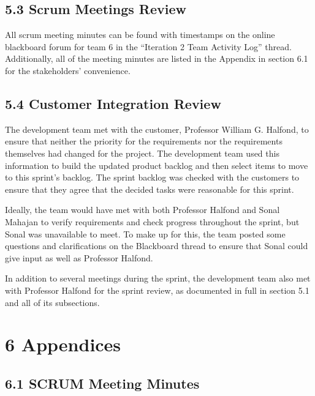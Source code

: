 \documentclass[]{article}
\begin{document}
\subsection{5.3 Scrum Meetings Review}\label{scrum-meetings-review}

All scrum meeting minutes can be found with timestamps on the online
blackboard forum for team 6 in the ``Iteration 2 Team Activity Log''
thread. Additionally, all of the meeting minutes are listed in the
Appendix in section 6.1 for the stakeholders' convenience.

\subsection{5.4 Customer Integration
Review}\label{customer-integration-review}

The development team met with the customer, Professor William G.
Halfond, to ensure that neither the priority for the requirements nor
the requirements themselves had changed for the project. The development
team used this information to build the updated product backlog and then
select items to move to this sprint's backlog. The sprint backlog was
checked with the customers to ensure that they agree that the decided
tasks were reasonable for this sprint.

Ideally, the team would have met with both Professor Halfond and Sonal
Mahajan to verify requirements and check progress throughout the sprint,
but Sonal was unavailable to meet. To make up for this, the team posted
some questions and clarifications on the Blackboard thread to ensure
that Sonal could give input as well as Professor Halfond.

In addition to several meetings during the sprint, the development team
also met with Professor Halfond for the sprint review, as documented in
full in section 5.1 and all of its subsections.

\section{6 Appendices}\label{appendices}

\subsection{6.1 SCRUM Meeting Minutes}\label{scrum-meeting-minutes}
\end{document}
